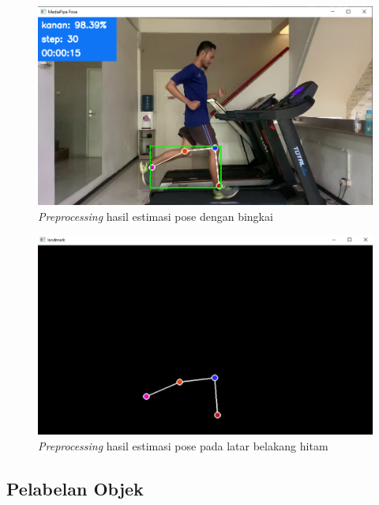 \begin{figure}[H]
  \centering
  \includegraphics[scale=0.48]{gambar/deteksi pose2.png}
  \caption{\emph{Preprocessing} hasil estimasi pose dengan bingkai}
  \label{fig:PreProcessing1}
\end{figure}

\begin{figure}[H]
  \centering
  \includegraphics[scale=0.8]{gambar/deteksi pose3.png}
  \caption{\emph{Preprocessing} hasil estimasi pose pada latar belakang hitam}
  \label{fig:PreProcessing2}
\end{figure}

\subsection{Pelabelan Objek}
\label{subsec:PelabelanObjek}

